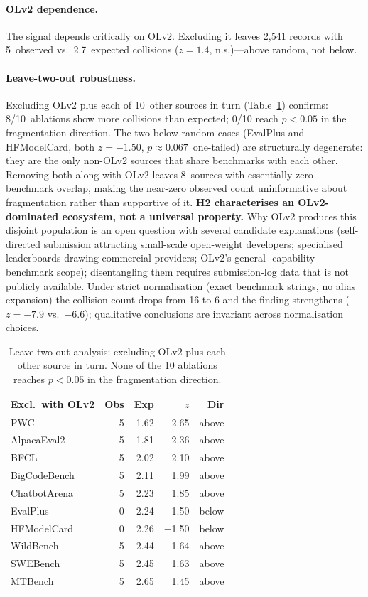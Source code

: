 \documentclass[11pt]{article}
\begin{document}
\paragraph{OLv2 dependence.}
The signal depends critically on OLv2. Excluding it leaves 2{,}541
records with 5~observed vs.\ 2.7~expected collisions ($z = 1.4$,
n.s.)---above random, not below.

\paragraph{Leave-two-out robustness.}
Excluding OLv2 plus each of 10~other sources in turn
(Table~\ref{tab:leave_two_out}) confirms:
8/10~ablations show more collisions than expected;
0/10 reach $p < 0.05$ in the fragmentation direction.
The two below-random cases (EvalPlus and HFModelCard, both
$z = -1.50$, $p \approx 0.067$~one-tailed) are structurally degenerate:
they are the only non-OLv2 sources that share benchmarks with each
other. Removing both along with OLv2 leaves 8~sources with
essentially zero benchmark overlap, making the near-zero observed
count uninformative about fragmentation rather than supportive of it.
\textbf{H2 characterises an OLv2-dominated ecosystem, not a universal
property.} Why OLv2
produces this disjoint population is an open question with
several candidate explanations (self-directed submission
attracting small-scale open-weight developers; specialised
leaderboards drawing commercial providers; OLv2's general-
capability benchmark scope); disentangling them requires
submission-log data that is not publicly available. Under strict
normalisation (exact benchmark strings, no alias expansion) the
collision count drops from 16 to 6 and the finding strengthens
($z = -7.9$ vs.\ $-6.6$); qualitative conclusions are invariant
across normalisation choices.

\begin{table}[t]
\centering
\small
\caption{Leave-two-out analysis: excluding OLv2 plus each other
source in turn. None of the 10 ablations reaches $p < 0.05$ in the
fragmentation direction.}
\label{tab:leave_two_out}
\begin{tabular}{lrrrr}
\toprule
\textbf{Excl.\ with OLv2} & \textbf{Obs} & \textbf{Exp}
  & $z$ & \textbf{Dir} \\
\midrule
PWC          & 5 & 1.62 & 2.65 & above \\
AlpacaEval2  & 5 & 1.81 & 2.36 & above \\
BFCL         & 5 & 2.02 & 2.10 & above \\
BigCodeBench & 5 & 2.11 & 1.99 & above \\
ChatbotArena & 5 & 2.23 & 1.85 & above \\
EvalPlus     & 0 & 2.24 & $-$1.50 & below \\
HFModelCard  & 0 & 2.26 & $-$1.50 & below \\
WildBench    & 5 & 2.44 & 1.64 & above \\
SWEBench     & 5 & 2.45 & 1.63 & above \\
MTBench      & 5 & 2.65 & 1.45 & above \\
\bottomrule
\end{tabular}
\end{table}
\end{document}
